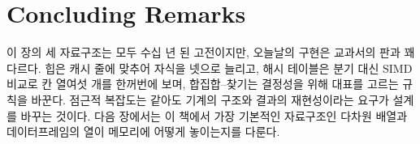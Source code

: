 \section{Concluding Remarks}

이 장의 세 자료구조는 모두 수십 년 된 고전이지만, 오늘날의 구현은 교과서의 판과 꽤 다르다. 힙은 캐시 줄에 맞추어 자식을 넷으로 늘리고, 해시 테이블은 분기 대신 SIMD 비교로 칸 열여섯 개를 한꺼번에 보며, 합집합--찾기는 결정성을 위해 대표를 고르는 규칙을 바꾼다. 점근적 복잡도는 같아도 기계의 구조와 결과의 재현성이라는 요구가 설계를 바꾸는 것이다. 다음 장에서는 이 책에서 가장 기본적인 자료구조인 다차원 배열과 데이터프레임의 열이 메모리에 어떻게 놓이는지를 다룬다.

\chapterreferences

